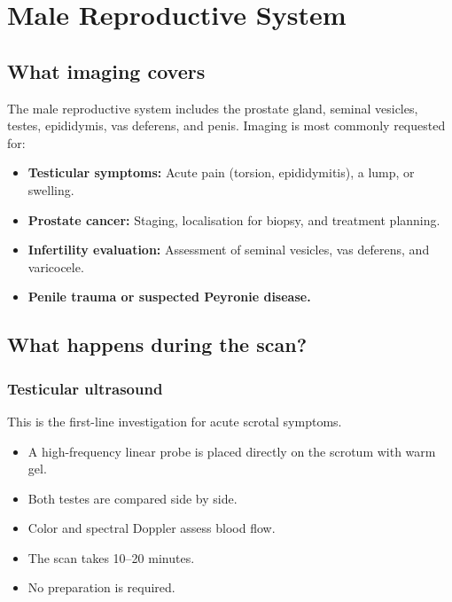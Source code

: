 \chapter{Male Reproductive System}

\label{ch:ch51_male_reproductive}

\section{What imaging covers}
The male reproductive system includes the prostate gland, seminal vesicles, testes, epididymis, vas deferens, and penis. Imaging is most commonly requested for:
\begin{itemize}
    \item \textbf{Testicular symptoms:} Acute pain (torsion, epididymitis), a lump, or swelling.
    \item \textbf{Prostate cancer:} Staging, localisation for biopsy, and treatment planning.
    \item \textbf{Infertility evaluation:} Assessment of seminal vesicles, vas deferens, and varicocele.
    \item \textbf{Penile trauma or suspected Peyronie disease.}
\end{itemize}

\section{What happens during the scan?}

\subsection{Testicular ultrasound}
This is the first-line investigation for acute scrotal symptoms.
\begin{itemize}
    \item A high-frequency linear probe is placed directly on the scrotum with warm gel.
    \item Both testes are compared side by side.
    \item Color and spectral Doppler assess blood flow.
    \item The scan takes 10--20 minutes.
    \item No preparation is required.
\end{itemize}

